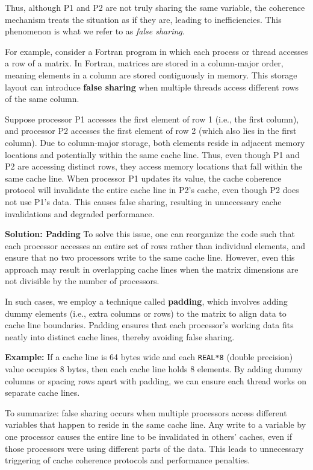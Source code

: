 \documentclass[12pt]{book}
\begin{document}
Thus, although P1 and P2 are not truly sharing the same variable, the coherence mechanism treats the situation as if they are, leading to inefficiencies. This phenomenon is what we refer to as \textit{false sharing}.

For example, consider a Fortran program in which each process or thread accesses a row of a matrix. In Fortran, matrices are stored in a column-major order, meaning elements in a column are stored contiguously in memory. This storage layout can introduce \textbf{false sharing} when multiple threads access different rows of the same column.

Suppose processor P1 accesses the first element of row 1 (i.e., the first column), and processor P2 accesses the first element of row 2 (which also lies in the first column). Due to column-major storage, both elements reside in adjacent memory locations and potentially within the same cache line. Thus, even though P1 and P2 are accessing distinct rows, they access memory locations that fall within the same cache line. When processor P1 updates its value, the cache coherence protocol will invalidate the entire cache line in P2's cache, even though P2 does not use P1's data. This causes false sharing, resulting in unnecessary cache invalidations and degraded performance.

\textbf{Solution: Padding}
To solve this issue, one can reorganize the code such that each processor accesses an entire set of rows rather than individual elements, and ensure that no two processors write to the same cache line. However, even this approach may result in overlapping cache lines when the matrix dimensions are not divisible by the number of processors.

In such cases, we employ a technique called \textbf{padding}, which involves adding dummy elements (i.e., extra columns or rows) to the matrix to align data to cache line boundaries. Padding ensures that each processor's working data fits neatly into distinct cache lines, thereby avoiding false sharing.

\medskip
\textbf{Example:} If a cache line is 64 bytes wide and each \texttt{REAL*8} (double precision) value occupies 8 bytes, then each cache line holds 8 elements. By adding dummy columns or spacing rows apart with padding, we can ensure each thread works on separate cache lines.




To summarize: false sharing occurs when multiple processors access different variables that happen to reside in the same cache line. Any write to a variable by one processor causes the entire line to be invalidated in others' caches, even if those processors were using different parts of the data. This leads to unnecessary triggering of cache coherence protocols and performance penalties.
\end{document}

